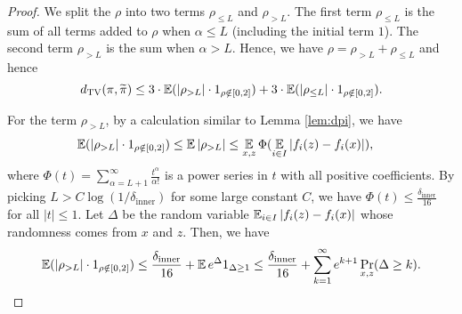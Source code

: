 \begin{proof}



We split the $\rho$ into two terms $\rho_{\leq L}$ and $\rho_{>L}$.
The first term $\rho_{\leq L}$ is the sum of all terms added to $\rho$
when $\alpha\leq L$ (including the initial term $1$). The second
term $\rho_{>L}$ is the sum when $\alpha>L$. Hence, we have $\rho=\rho_{>L}+\rho_{\leq L}$
and hence
\begin{equation}
d_{\mathrm{TV}}(\pi,\widetilde{\pi})\leq3\cdot\operatorname*{\mathbb{E}}(|\rho_{>L}|\cdot1_{\rho \notin [0,2]})+3\cdot\operatorname*{\mathbb{E}}(|\rho_{\leq L}|\cdot1_{\rho \notin [0,2]}).\label{eq:dTV2}
\end{equation}

For the term $\rho_{>L}$, by a calculation similar to Lemma \ref{lem:dpi},
we have
\begin{align*}
\operatorname*{\mathbb{E}}(|\rho_{>L}|\cdot1_{\rho \notin [0,2]}) & \leq\operatorname*{\mathbb{E}}|\rho_{>L}|\leq\operatorname*{\mathbb{E}}_{x,z}\Phi(\operatorname*{\mathbb{E}}_{i\in I}|f_{i}(z)-f_{i}(x)|),
\end{align*}
where $\Phi(t)=\sum_{\alpha=L+1}^{\infty}\frac{t^{\alpha}}{\alpha!}$ is a power series in $t$ with all positive coefficients.
By picking $L>C\log(1/\delta_{\mathrm{inner}})$ for some large constant
$C$, we have $\Phi(t)\leq\frac{\delta_{\mathrm{inner}}}{16}$
for all $|t|\leq1$. Let $\Delta$ be the random variable $\operatorname*{\mathbb{E}}_{i\in I}|f_{i}(z)-f_{i}(x)|$ whose randomness comes from $x$ and $z$.
Then, we have
\[
\operatorname*{\mathbb{E}}(|\rho_{>L}|\cdot1_{\rho \notin [0,2]})\leq\frac{\delta_{\mathrm{inner}}}{16}+\operatorname*{\mathbb{E}} e^{\Delta}1_{\Delta\geq1}\leq\frac{\delta_{\mathrm{inner}}}{16}+\sum_{k=1}^{\infty}e^{k+1}\Pr_{x,z}(\Delta\geq k).
\]


\end{proof}
